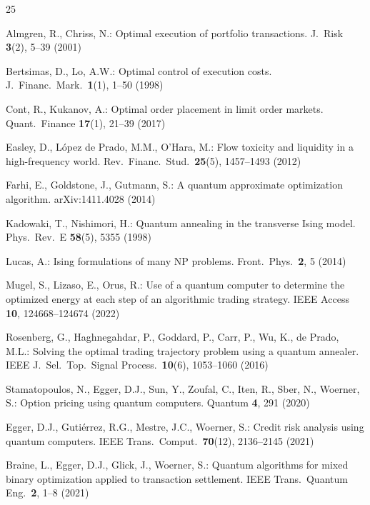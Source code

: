 \documentclass[11pt]{article}
\begin{document}
\begin{thebibliography}{25}

Almgren, R., Chriss, N.: Optimal execution of portfolio transactions. J.\ Risk \textbf{3}(2), 5--39 (2001)

Bertsimas, D., Lo, A.W.: Optimal control of execution costs. J.\ Financ.\ Mark.\ \textbf{1}(1), 1--50 (1998)

Cont, R., Kukanov, A.: Optimal order placement in limit order markets. Quant.\ Finance \textbf{17}(1), 21--39 (2017)

Easley, D., L{\'o}pez de Prado, M.M., O'Hara, M.: Flow toxicity and liquidity in a high-frequency world. Rev.\ Financ.\ Stud.\ \textbf{25}(5), 1457--1493 (2012)

Farhi, E., Goldstone, J., Gutmann, S.: A quantum approximate optimization algorithm. arXiv:1411.4028 (2014)

Kadowaki, T., Nishimori, H.: Quantum annealing in the transverse Ising model. Phys.\ Rev.\ E \textbf{58}(5), 5355 (1998)

Lucas, A.: Ising formulations of many NP problems. Front.\ Phys.\ \textbf{2}, 5 (2014)

Mugel, S., Lizaso, E., Orus, R.: Use of a quantum computer to determine the optimized energy at each step of an algorithmic trading strategy. IEEE Access \textbf{10}, 124668--124674 (2022)

Rosenberg, G., Haghnegahdar, P., Goddard, P., Carr, P., Wu, K., de Prado, M.L.: Solving the optimal trading trajectory problem using a quantum annealer. IEEE J.\ Sel.\ Top.\ Signal Process.\ \textbf{10}(6), 1053--1060 (2016)

Stamatopoulos, N., Egger, D.J., Sun, Y., Zoufal, C., Iten, R., Sber, N., Woerner, S.: Option pricing using quantum computers. Quantum \textbf{4}, 291 (2020)

Egger, D.J., Guti{\'e}rrez, R.G., Mestre, J.C., Woerner, S.: Credit risk analysis using quantum computers. IEEE Trans.\ Comput.\ \textbf{70}(12), 2136--2145 (2021)

Braine, L., Egger, D.J., Glick, J., Woerner, S.: Quantum algorithms for mixed binary optimization applied to transaction settlement. IEEE Trans.\ Quantum Eng.\ \textbf{2}, 1--8 (2021)


\end{thebibliography}
\end{document}
